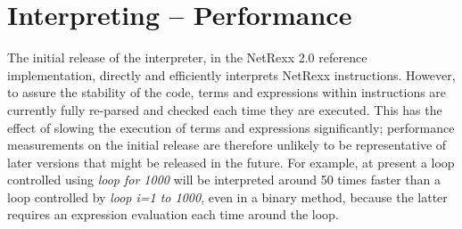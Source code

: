 \section{Interpreting -- Performance}
The initial release of the interpreter, in the NetRexx 2.0 reference
implementation, directly and efficiently interprets NetRexx
instructions.  However, to assure the stability of the code, terms and
expressions within instructions are currently fully re-parsed and
checked each time they are executed.  This has the effect of slowing the
execution of terms and expressions significantly; performance
measurements on the initial release are therefore unlikely to be
representative of later versions that might be released in the future.
\newline
For example, at present a loop controlled using \emph{loop for
1000} will be interpreted around 50 times faster than a loop
controlled by \emph{loop i=1 to 1000}, even in a binary method,
because the latter requires an expression evaluation each time around
the loop.

